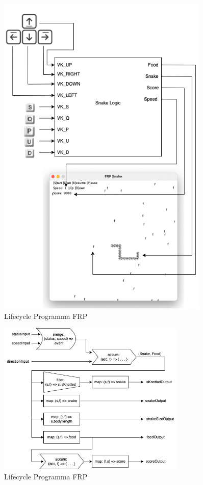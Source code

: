 \documentclass[../main.tex]{subfiles}
\begin{document}
\newpage
\begin{figure}[H]
\centering
\includegraphics[width=0.9\textwidth]{img/frp-scala-Page-2.drawio.png}
\caption{Lifecycle Programma FRP}
\end{figure}

\newpage
\begin{figure}[H]
\centering
\includegraphics[width=0.8\textwidth]{img/frp-scala-Page-5.drawio.png}
\caption{Lifecycle Programma FRP}
\end{figure}
\end{document}
